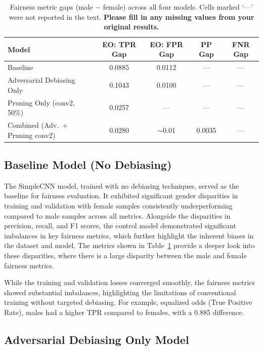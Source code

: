 \documentclass[11pt]{article}
\begin{document}
\begin{table}[H]
\centering
\caption{Fairness metric gaps (male $-$ female) across all four models.
Cells marked `---' were not reported in the text.
\textbf{Please fill in any missing values from your original results.}}
\label{tab:results}
\renewcommand{\arraystretch}{1.3}
\begin{tabular}{lcccc}
\toprule
\textbf{Model} & \textbf{EO: TPR Gap} & \textbf{EO: FPR Gap} & \textbf{PP Gap} & \textbf{FNR Gap} \\
\midrule
Baseline                          & 0.0885 & 0.0112 & ---    & --- \\
Adversarial Debiasing Only        & 0.1043 & 0.0100 & ---    & --- \\
Pruning Only (conv2, 50\%)        & 0.0257 & ---    & ---    & --- \\
Combined (Adv.\ + Pruning conv2)  & 0.0280 & ${\sim}$0.01 & 0.0035 & --- \\
\bottomrule
\end{tabular}
\end{table}

\subsection{Baseline Model (No Debiasing)}

The SimpleCNN model, trained with no debiasing techniques, served as the baseline for fairness evaluation. It exhibited significant gender disparities in training and validation with female samples consistently underperforming compared to male samples across all metrics. Alongside the disparities in precision, recall, and F1 scores, the control model demonstrated significant imbalances in key fairness metrics, which further highlight the inherent biases in the dataset and model. The metrics shown in Table~\ref{tab:results} provide a deeper look into these disparities, where there is a large disparity between the male and female fairness metrics.

While the training and validation losses converged smoothly, the fairness metrics showed substantial imbalances, highlighting the limitations of conventional training without targeted debiasing. For example, equalized odds (True Positive Rate), males had a higher TPR compared to females, with a 0.885 difference.

\subsection{Adversarial Debiasing Only Model}
\end{document}
